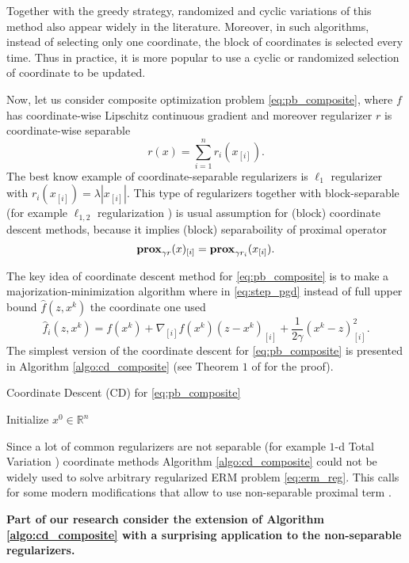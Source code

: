 Together with the greedy strategy, randomized and cyclic variations of this method also appear widely in the literature. Moreover, in such algorithms, instead of selecting only one coordinate, the block of coordinates is selected every time. Thus in practice, it is more popular to use a cyclic or randomized selection of coordinate to be updated.

Now, let us consider composite optimization problem \eqref{eq:pb_composite}, where $f$ has coordinate-wise Lipschitz continuous gradient and moreover regularizer $r$ is coordinate-wise separable
$$
r(x) = \sum_{i=1}^nr_i(x_{[i]}).
$$
The best know example of coordinate-separable regularizers is $\ell_1$ regularizer with $r_i(x_{[i]}) = \lambda |x_{[i]}|$. This type of regularizers together with block-separable (for example $\ell_{1,2}$ regularization \cite{bach2012optimization}) is usual assumption for (block) coordinate descent methods, because it implies (block) separaboility of proximal operator
$$
\mathbf{prox}_{\gamma r}(x)_{[i]} = \mathbf{prox}_{\gamma r_i}(x_{[i]}).
$$

The key idea of coordinate descent method for \eqref{eq:pb_composite} is to make a majorization-minimization algorithm where in \eqref{eq:step_pgd} instead of full upper bound $\hat{f}(z, x^k)$ the coordinate one used
$$
\hat{f}_i(z, x^k) = f(x^k) + \nabla_{[i]} f(x^k) (z-x^k)_{[i]}+\frac{1}{2\gamma}(x^k-z)_{[i]}^2.
$$
The simplest version of the coordinate descent for \eqref{eq:pb_composite} is presented in Algorithm \ref{algo:cd_composite} (see Theorem $1$ of \cite{richtarik2012efficient} for the proof).

\begin{algorithm}
    \caption{Coordinate Descent (CD) for \eqref{eq:pb_composite}}
    \label{algo:cd_composite}
    \begin{algorithmic}
        \STATE Initialize $x^0\in\mathbb{R}^n$
        \ENDFOR
    \end{algorithmic}
\end{algorithm}

Since a lot of common regularizers are not separable (for example $1$-d Total Variation \cite{bach2012optimization}) coordinate methods Algorithm \ref{algo:cd_composite} could not be widely used to solve arbitrary regularized ERM problem \eqref{eq:erm_reg}. This calls for some modern modifications that allow to use non-separable proximal term \cite{hanzely2018sega}. 

{\color{red}\textbf{Part of our research consider the extension of Algorithm \ref{algo:cd_composite} with a surprising application to the non-separable regularizers.}}